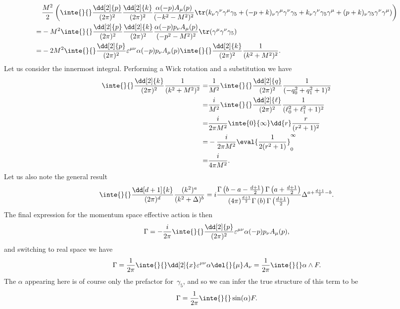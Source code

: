 \begin{align*}
	 &\frac{M^{2}}{2}\left(\inte{}{}\frac{\dd[2]{p}}{(2\pi)^{2}}\frac{\dd[2]{k}}{(2\pi)^{2}}\frac{\alpha(-p)A_{\mu}(p)}{(-k^{2} - M^{2})^{2}}\tr(k_{\nu}\gamma^{\nu}\gamma^{\mu}\gamma_{5} + (-p + k)_{\nu}\gamma^{\mu}\gamma^{\nu}\gamma_{5} + k_{\nu}\gamma^{\nu}\gamma_{5}\gamma^{\mu} + (p + k)_{\nu}\gamma_{5}\gamma^{\nu}\gamma^{\mu})\right) \\
	=& -M^{2}\inte{}{}\frac{\dd[2]{p}}{(2\pi)^{2}}\frac{\dd[2]{k}}{(2\pi)^{2}}\frac{\alpha(-p)p_{\nu}A_{\mu}(p)}{(-p^{2} - M^{2})^{2}}\tr(\gamma^{\mu}\gamma^{\nu}\gamma_{5}) \\
	=& -2M^{2}\inte{}{}\frac{\dd[2]{p}}{(2\pi)^{2}}\varepsilon^{\mu\nu}\alpha(-p)p_{\nu}A_{\mu}(p)\inte{}{}\frac{\dd[2]{k}}{(2\pi)^{2}}\frac{1}{(k^{2} + M^{2})^{2}}.
\end{align*}
Let us consider the innermost integral. Performing a Wick rotation and a substitution we have
\begin{align*}
	\inte{}{}\frac{\dd[2]{k}}{(2\pi)^{2}}\frac{1}{(k^{2} + M^{2})^{2}} =& \frac{1}{M^{2}}\inte{}{}\frac{\dd[2]{q}}{(2\pi)^{2}}\frac{1}{(-q_{0}^{2} + q_{1}^{2} + 1)^{2}} \\
	=& \frac{i}{M^{2}}\inte{}{}\frac{\dd[2]{\ell}}{(2\pi)^{2}}\frac{1}{(\ell_{0}^{2} + \ell_{1}^{2} + 1)^{2}} \\
	=& \frac{i}{2\pi M^{2}}\inte{0}{\infty}\dd{r}\frac{r}{(r^{2} + 1)^{2}} \\
	=& -\frac{i}{2\pi M^{2}}\eval{\frac{1}{2(r^{2} + 1)}}_{0}^{\infty} \\
	=& \frac{i}{4\pi M^{2}}.
\end{align*}
Let us also note the general result
\begin{align*}
	\inte{}{}\frac{\dd[d + 1]{k}}{(2\pi)^{d}}\frac{(k^{2})^{a}}{(k^{2} + \Delta)^{b}} = i\frac{\Gamma\left(b - a - \frac{d + 1}{2}\right)\Gamma\left(a + \frac{d + 1}{2}\right)}{(4\pi)^{\frac{d + 1}{2}}\Gamma\left(b\right)\Gamma\left(\frac{d + 1}{2}\right)}\Delta^{a + \frac{d + 1}{2} - b}.
\end{align*}
The final expression for the momentum space effective action is then
\begin{align*}
	\Gamma = -\frac{i}{2\pi}\inte{}{}\frac{\dd[2]{p}}{(2\pi)^{2}}\varepsilon^{\mu\nu}\alpha(-p)p_{\nu}A_{\mu}(p),
\end{align*}
and switching to real space we have
\begin{align*}
	\Gamma = \frac{1}{2\pi}\inte{}{}\dd[2]{x}\varepsilon^{\mu\nu}\alpha\del{}{\mu}A_{\nu} = \frac{1}{2\pi}\inte{}{}\alpha\wedge F.
\end{align*}
The $\alpha$ appearing here is of course only the prefactor for $\gamma_{5}$, and so we can infer the true structure of this term to be
\begin{align*}
	\Gamma = \frac{1}{2\pi}\inte{}{}\sin(\alpha)F.
\end{align*}

